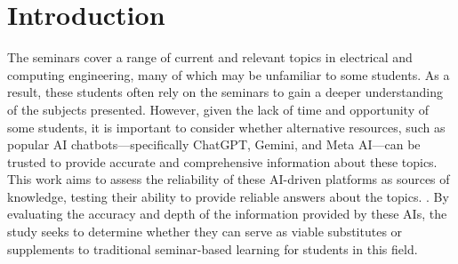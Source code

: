 \section{Introduction}

The seminars cover a range of current and relevant topics in electrical and computing engineering, many of which may be 
unfamiliar to some students. As a result, these students often rely on the seminars to gain a deeper understanding of the 
subjects presented. However, given the lack of time and opportunity of some students, it is important to
consider whether alternative resources, such as popular AI chatbots—specifically ChatGPT, Gemini, and Meta AI—can be trusted
to provide accurate and comprehensive information about these topics. This work aims to assess the reliability
of these AI-driven platforms as sources of knowledge, testing their ability to provide reliable answers about the topics.
. By evaluating the accuracy and depth of the information provided by these AIs, the study seeks to determine whether they
can serve as viable substitutes or supplements to traditional seminar-based learning for students in this field.
\pagebreak